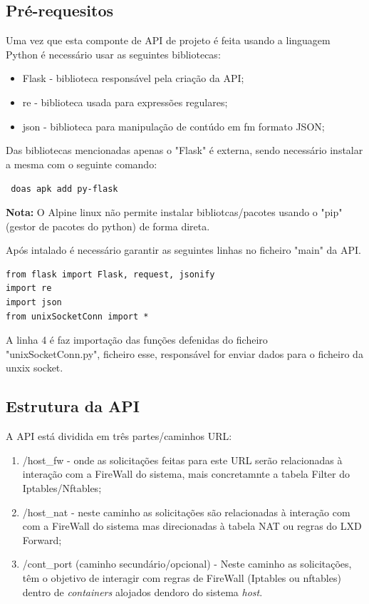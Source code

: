 \subsection{Pré-requesitos}

Uma vez que esta componte de API de projeto é feita usando a linguagem Python é necessário
usar as seguintes bibliotecas:

\begin{itemize}
    \item Flask - biblioteca responsável pela criação da API;
    \item re - biblioteca usada para expressões regulares;
    \item json - biblioteca para manipulação de contúdo em fm formato JSON;
\end{itemize}
    
Das bibliotecas mencionadas apenas o "Flask" é externa, sendo necessário instalar a mesma
com o seguinte comando:

\begin{tcolorbox}[colback=blue!5!white,colframe=blue!75!black]
    \verb | doas apk add py-flask |
\end{tcolorbox}

\textbf{Nota:} O Alpine linux não permite instalar bibliotcas/pacotes usando o "pip" (gestor de pacotes
do python) de forma direta.

Após intalado é necessário garantir as seguintes linhas no ficheiro "main" da API.

\begin{lstlisting}[language=csh, caption={Importações necessárias}]
from flask import Flask, request, jsonify
import re
import json
from unixSocketConn import *
\end{lstlisting}

A linha 4 é faz importação das funções defenidas do ficheiro "unixSocketConn.py", ficheiro esse, 
responsável for enviar dados para o ficheiro da unxix socket.


\subsection{Estrutura da API}

A API está dividida em três partes/caminhos URL:

\begin{enumerate}
    \item  \slash host\_fw - onde as solicitações feitas para este URL serão relacionadas à interação
    com a FireWall do sistema, mais concretamnte a tabela Filter do Iptables\slash Nftables;
    \item  \slash host\_nat - neste caminho as solicitações são relacionadas à interação com
    com a FireWall do sistema mas direcionadas à tabela NAT ou regras do LXD Forward;
    \item  \slash cont\_port (caminho secundário/opcional) - Neste caminho as solicitações, têm o objetivo de interagir com regras de FireWall
    (Iptables ou nftables) dentro de \textit{containers} alojados dendoro do sistema \textit{host}. 
\end{enumerate}



